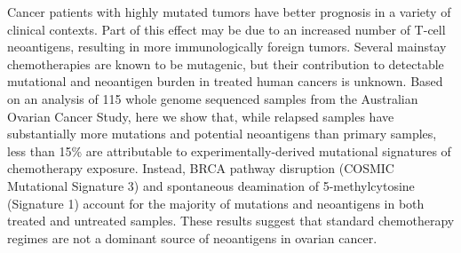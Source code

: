 Cancer patients with highly mutated tumors have better prognosis in a variety of clinical contexts. Part of this effect may be due to an increased number of T-cell neoantigens, resulting in more immunologically foreign tumors. Several mainstay chemotherapies are known to be mutagenic, but their contribution to detectable mutational and neoantigen burden in treated human cancers is unknown. Based on an analysis of 115 whole genome sequenced samples from the Australian Ovarian Cancer Study, here we show that, while relapsed samples have substantially more mutations and potential neoantigens than primary samples, less than 15\% are attributable to experimentally-derived mutational signatures of chemotherapy exposure. Instead, BRCA pathway disruption (COSMIC Mutational Signature 3) and spontaneous deamination of 5-methylcytosine (Signature 1) account for the majority of mutations and neoantigens in both treated and untreated samples. These results suggest that standard chemotherapy regimes are not a dominant source of neoantigens in ovarian cancer.

